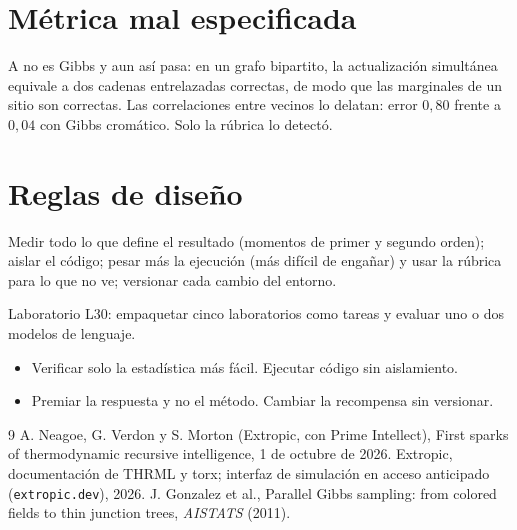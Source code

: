 \documentclass[11pt,a4paper]{article}
\begin{document}
\section{Métrica mal especificada}
A no es Gibbs y aun así pasa: en un grafo bipartito, la actualización simultánea equivale a dos cadenas entrelazadas correctas, de modo que las marginales de un sitio son
correctas. Las correlaciones entre vecinos lo delatan: error $0{,}80$ frente a $0{,}04$ con Gibbs cromático. Solo la rúbrica lo detectó.

\section{Reglas de diseño}
Medir todo lo que define el resultado (momentos de primer y segundo orden); aislar el código; pesar más la ejecución (más difícil de engañar) y usar la rúbrica para lo que
no ve; versionar cada cambio del entorno.

\begin{aplicacion}
Laboratorio L30: empaquetar cinco laboratorios como tareas y evaluar uno o dos modelos de lenguaje.
\end{aplicacion}

\begin{error}
\begin{itemize}[nosep]
\item Verificar solo la estadística más fácil. \quad Ejecutar código sin aislamiento.
\item Premiar la respuesta y no el método. \quad Cambiar la recompensa sin versionar.
\end{itemize}
\end{error}

\begin{thebibliography}{9}\small
{} A. Neagoe, G. Verdon y S. Morton (Extropic, con Prime Intellect), First sparks of thermodynamic recursive intelligence, 1 de octubre de 2026.
 Extropic, documentación de THRML y torx; interfaz de simulación en acceso anticipado (\texttt{extropic.dev}), 2026.
 J. Gonzalez et al., Parallel Gibbs sampling: from colored fields to thin junction trees, \emph{AISTATS} (2011).
\end{thebibliography}
\end{document}

